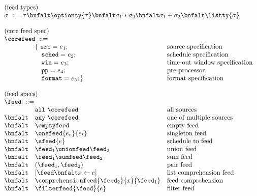 \begin{figure}[t]
\[
\begin{array}{lll}
\multicolumn{3}{l}{\mbox{(feed types)}}\\ 
\multicolumn{3}{l}{\sigma \ ::= \tau \bnfalt \optionty{\tau} 
  \bnfalt \sigma_1 * \sigma_2
  \bnfalt \sigma_1 + \sigma_2
  \bnfalt \listty{\sigma}
}   \\  
\\
\multicolumn{3}{l}{\mbox{(core feed spec)}}\\ 
\multicolumn{3}{l}{\corefeed \ ::= }\\
& \{ \ \mathtt{src=}\    e_1;    & \mbox{source specification} \\
& \ \ \ \mathtt{sched=}\  e_2;    & \mbox{schedule specification}\\
& \ \ \ \mathtt{win=}\    e_3;    & \mbox{time-out window specification} \\
& \ \ \ \mathtt{pp=}\     e_4;    & \mbox{pre-processor} \\
& \ \ \ \mathtt{format=}\ e_5; \} & \mbox{format specification}\\ 
\\
\multicolumn{3}{l}{\mbox{(feed specs)}}\\ 
\multicolumn{3}{l}{\feed \ ::=}   \\  
         & \mathtt{all}\ \corefeed & \mbox{all sources}\\ 
 \bnfalt & \mathtt{any}\ \corefeed & \mbox{one of multiple sources}\\ 
 \bnfalt & \emptyfeed & \mbox{empty feed} \\
 \bnfalt & \onefeed{e_v}{e_t} & \mbox{singleton feed} \\
 \bnfalt & \sfeed{e} & \mbox{schedule to feed} \\
 \bnfalt & \feed_1 \unionfeed \feed_2 & \mbox{union feed} \\
 \bnfalt & \feed_1 \sumfeed \feed_2 & \mbox{sum feed} \\
 \bnfalt & (\feed_1, \feed_2) & \mbox{pair feed} \\
 \bnfalt & [\feed \bnfalt x \leftarrow e ] & \mbox{list comprehension feed} \\
 \bnfalt & \comprehensionfeed{\feed_2}{x}{\feed_1} & \mbox{feed comprehension} \\
 \bnfalt & \filterfeed{\feed}{e} & \mbox{filter feed} \\

\end{array}\]
\end{figure}
